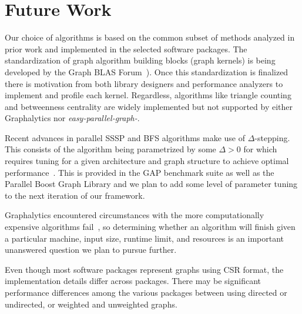 \documentclass[conference]{IEEEtran}
\begin{document}
\section{Future Work}\label{sec:fw}

Our choice of algorithms is based on the common subset of methods analyzed in prior work and implemented in the selected software packages. The standardization of graph algorithm building blocks (graph kernels) is being developed by the Graph BLAS Forum~\cite{Mattson:2013:graphblas}). Once this standardization is finalized there is motivation from both library designers and performance analyzers to implement and profile each kernel. Regardless, algorithms like triangle counting and betweenness centrality are widely implemented but not supported by either Graphalytics nor \emph{easy-parallel-graph\mbox{-\textasteriskcentered}}. 

Recent advances in parallel SSSP and BFS algorithms make use of $\Delta$-stepping. This consists of the algorithm being parametrized by some $\Delta > 0$ for which requires tuning for a given architecture and graph structure to achieve optimal performance~\cite{Panitanarak:2014:SSSPPerf}. This is provided in the GAP benchmark suite as well as the Parallel Boost Graph Library and we plan to add some level of parameter tuning to the next iteration of our framework.

Graphalytics encountered circumstances with the more computationally expensive algorithms fail~\cite{Iosup:2016:Graphalyticstech}, so determining whether an algorithm will finish given a particular machine, input size, runtime limit, and resources is an important unanswered question we plan to pursue further.

Even though most software packages represent graphs using CSR format, the implementation details differ across packages. There may be significant performance differences among the various packages between using directed or undirected, or weighted and unweighted graphs.
\end{document}
